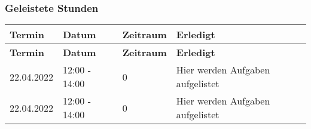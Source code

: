 \subsubsection{Geleistete Stunden}
\begin{flushleft}
		\begin{longtable}{p{2cm}p{}p{2cm}p{}}
            \toprule
            \textbf{Termin} & \textbf{Datum} & \textbf{Zeitraum} & \textbf{Erledigt}\\
            \midrule\endfirsthead
            \toprule
            \textbf{Termin} & \textbf{Datum} & \textbf{Zeitraum} & \textbf{Erledigt}\\
            \midrule\endhead
            	22.04.2022 & 12:00 - 14:00 & 0 & Hier werden Aufgaben aufgelistet \\ \midrule
				22.04.2022 & 12:00 - 14:00 & 0 & Hier werden Aufgaben aufgelistet \\ 
            \bottomrule
    \end{longtable}
\end{flushleft}